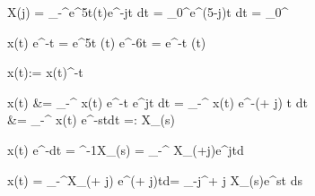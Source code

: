 \begin{abox}
	X(j\omega) = \int_{-\infty}^{\infty}e^{5t}\epsilon(t)\cdot e^{-j\omega t} dt = \int_{0}^{\infty}e^{(5-j\omega)\cdot t} dt = _0^\infty \to \infty
\end{abox}

\begin{abox}
	x(t) \cdot e^{-\sigma t} = e^{5t} \cdot \epsilon(t) \cdot e^{-6t} = e^{-t} \cdot \epsilon(t)
\end{abox}

\begin{abox}
	\left\lbrace x(t)\right\rbrace  := \left\lbrace x(t)\cdot \epsilon^{-\sigma t}\right\rbrace 
\end{abox}

\begin{abox}
	\left\lbrace x(t) \right\rbrace &= \int_{-\infty}^{\infty} x(t) e^{-\sigma t} \cdot e^{j\omega t} dt = \int_{-\infty}^{\infty} x(t) e^{-(\sigma + j\omega) t} dt\\
	&= \int_{-\infty}^{\infty} x(t) \cdot e^{-st}dt =: X_{}(s)
\end{abox}

\begin{abox}
	x(t) e^{-dt} = ^{-1}\left\lbrace X_{}(s) \right\rbrace =  \int_{-\infty}^{\infty} X_{}(\sigma+j\omega)\cdot e^{j\omega t}d\omega
\end{abox}

\begin{abox}
	x(t) = \int_{-\infty}^{\infty}X_{}(\sigma + j\omega) \cdot e^{(\sigma + j\omega)\cdot t}d\omega =  \int_{\sigma -j\infty}^{\sigma + j \infty}X_{}(s)\cdot e^{st} ds
\end{abox}





